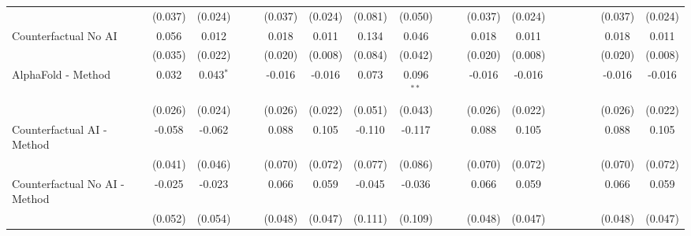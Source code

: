 \begin{tabular}{lcccccccccccccccccc}
                                                              & (0.037) & (0.024)     &     &     & (0.037)       & (0.024)        & (0.081)       & (0.050)       &     &      & (0.037)       & (0.024)        &      &      &      &      & (0.037)       & (0.024)\\   
   Counterfactual No AI                                       & 0.056   & 0.012       &     &     & 0.018         & 0.011          & 0.134         & 0.046         &     &      & 0.018         & 0.011          &      &      &      &      & 0.018         & 0.011\\   
                                                              & (0.035) & (0.022)     &     &     & (0.020)       & (0.008)        & (0.084)       & (0.042)       &     &      & (0.020)       & (0.008)        &      &      &      &      & (0.020)       & (0.008)\\   
   AlphaFold - Method                                         & 0.032   & 0.043$^{*}$ &     &     & -0.016        & -0.016         & 0.073         & 0.096$^{**}$  &     &      & -0.016        & -0.016         &      &      &      &      & -0.016        & -0.016\\   
                                                              & (0.026) & (0.024)     &     &     & (0.026)       & (0.022)        & (0.051)       & (0.043)       &     &      & (0.026)       & (0.022)        &      &      &      &      & (0.026)       & (0.022)\\   
   Counterfactual AI - Method                                 & -0.058  & -0.062      &     &     & 0.088         & 0.105          & -0.110        & -0.117        &     &      & 0.088         & 0.105          &      &      &      &      & 0.088         & 0.105\\   
                                                              & (0.041) & (0.046)     &     &     & (0.070)       & (0.072)        & (0.077)       & (0.086)       &     &      & (0.070)       & (0.072)        &      &      &      &      & (0.070)       & (0.072)\\   
   Counterfactual No AI - Method                              & -0.025  & -0.023      &     &     & 0.066         & 0.059          & -0.045        & -0.036        &     &      & 0.066         & 0.059          &      &      &      &      & 0.066         & 0.059\\   
                                                              & (0.052) & (0.054)     &     &     & (0.048)       & (0.047)        & (0.111)       & (0.109)       &     &      & (0.048)       & (0.047)        &      &      &      &      & (0.048)       & (0.047)\\   

\end{tabular}
